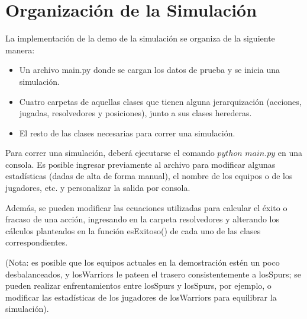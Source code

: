\section{Organización de la Simulación}
La implementación de la demo de la simulación se organiza de la siguiente manera:
\begin{itemize}
 \item Un archivo main.py donde se cargan los datos de prueba y se inicia una simulación.
 \item Cuatro carpetas de aquellas clases que tienen alguna jerarquización (acciones, jugadas, resolvedores y posiciones), junto a sus clases herederas.
 \item El resto de las clases necesarias para correr una simulación.
\end{itemize}

Para correr una simulación, deberá ejecutarse el comando $python$ $main.py$ en una consola. Es posible ingresar previamente al archivo para modificar algunas estadísticas (dadas de alta de forma manual), el nombre de los equipos o de los jugadores, etc. y personalizar la salida por consola.

Además, se pueden modificar las ecuaciones utilizadas para calcular el éxito o fracaso de una acción, ingresando en la carpeta resolvedores y alterando los cálculos planteados en la función esExitoso() de cada uno de las clases correspondientes. 

(Nota: es posible que los equipos actuales en la demostración estén un poco desbalanceados, y losWarriors le pateen el trasero consistentemente a losSpurs; se pueden realizar enfrentamientos entre losSpurs y losSpurs, por ejemplo, o modificar las estadísticas de los jugadores de losWarriors para equilibrar la simulación).